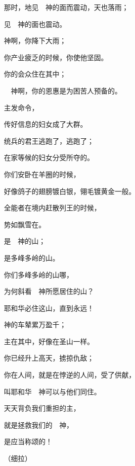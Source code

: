 {\Q {}那时，地见　神的面而震动，天也落雨；
\par }{见{}　神的面也震动。
\par }{\Q {}神啊，你降下大雨；
\par }{\Q 你产业{}疲乏的时候，你使他坚固。
\par }{\Q {}你的会众住在其中；
\par }{\Q 　神啊，你的恩惠是为困苦人预备的。
\par }{\BB \par }{\Q {}主发命令，
\par }{\Q 传好信息的妇女成了大群。
\par }{\Q {}统兵的君王逃跑了，逃跑了；
\par }{\Q 在家等候的妇女分受所夺的。
\par }{\Q {}你们安卧在羊圈的时候，
\par }{\Q 好像鸽子的翅膀镀白银，翎毛镀黄金一般。
\par }{\Q {}全能者在境内赶散列王的时候，
\par }{\Q 势如飘雪在{}。
\par }{\BB \par }{\Q {}是　神的山；
\par }{是多峰多岭的山。
\par }{\Q {}你们多峰多岭的山哪，
\par }{\Q 为何斜看　神所愿居住的山？
\par }{\Q 耶和华必住这山，直到永远！
\par }{\BB \par }{\Q {}神的车辇累万盈千；
\par }{\Q 主在其中，好像在{}圣山一样。
\par }{\Q {}你已经升上高天，掳掠仇敌；
\par }{\Q 你在人间，就是在悖逆的人间，受了供献，
\par }{\Q 叫耶和华　神可以与他们同住。
\par }{\BB \par }{\Q {}天天背负我们重担的主，
\par }{\Q 就是拯救我们的　神，
\par }{\Q 是应当称颂的！
\par }{\QS （细拉）
\par }
